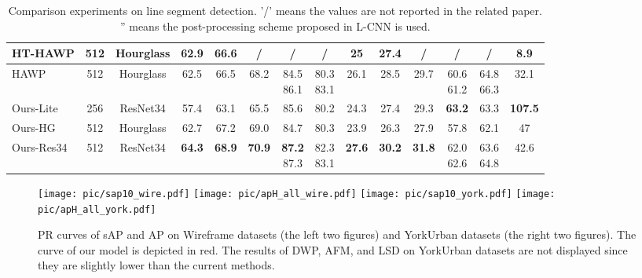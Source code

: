 \documentclass[10pt,twocolumn,letterpaper]{article}
\begin{document}
\begin{table*}[t]
{\begin{tabular}{|l|c|c|ccc|cc|ccc|cc|c|}
HT-HAWP\cite{HT-HAWP}         & 512                         & Hourglass                 & 62.9 & 66.6  & /     & /    & /    & 25   & 27.4  & /     & /    & /    & 8.9                    \\ \hline 
HAWP\cite{HAWP}            & 512                         & Hourglass                 & 62.5 & 66.5  & 68.2  & \makecell[l]{84.5 \\86.1} & \makecell[l]{80.3 \\83.1} & 26.1 & 28.5  & 29.7  & \makecell[l]{60.6 \\61.2} & \makecell[l]{64.8 \\66.3} & 32.1                 \\ \hline \hline
Ours-Lite         & 256                         & ResNet34                 & 57.4 & 63.1  & 65.5  & 85.6 & 80.2 &  24.3 & 27.4  & 29.3  & \textbf{63.2} & 63.3 & \textbf{107.5}                    \\ \hline
Ours-HG         & 512                         & Hourglass                 & 62.7 & 67.2  & 69.0  & 84.7 & 80.3 &  23.9 & 26.3  & 27.9  & 57.8 & 62.1 & 47                    \\ \hline
Ours-Res34      & 512                         & ResNet34                  & \textbf{64.3} & \textbf{68.9}  & \textbf{70.9}  & \makecell[l]{\textbf{87.2} \\87.3}  & \makecell[l]{82.3 \\83.1} & \textbf{27.6} & \textbf{30.2}  & \textbf{31.8}  & \makecell[l]{62.0 \\62.6} & \makecell[l]{63.6 \\64.8}     & 42.6                  \\ \hline
\end{tabular}
}
\caption{Comparison experiments on line segment detection. '/' means the values are not reported in the related paper. '' means the post-processing scheme proposed in L-CNN\cite{LCNN} is used.} 
\label{CompareWithLSD}
\end{table*}

\begin{figure*}[htbp]
\centering
\texttt{[image: pic/sap10\_wire.pdf]}
\texttt{[image: pic/apH\_all\_wire.pdf]}
\texttt{[image: pic/sap10\_york.pdf]}
\texttt{[image: pic/apH\_all\_york.pdf]}
\caption{PR curves of sAP and AP on Wireframe datasets (the left two figures) and YorkUrban datasets (the right two figures). The curve of our model is depicted in red. The results of DWP, AFM, and LSD on YorkUrban datasets are not displayed since they are slightly lower than the current methods.}
\label{PR}
\end{figure*}
\end{document}

